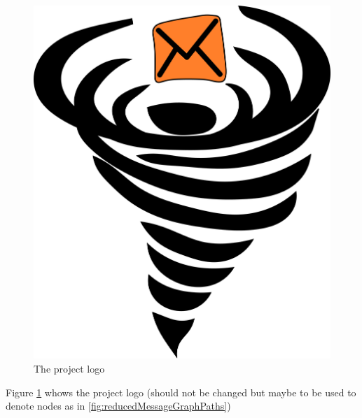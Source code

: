 \documentclass[11pt]{extarticle}
\begin{document}
	\begin{figure}[!h]
	\centering\includegraphics[width=\columnwidth]{../../../../website/src/main/jbake/assets/images/MessageVortexLogo_huge}
	\caption{The project logo}
	\label{fig:logo}
	\end{figure}
	Figure \ref{fig:logo} whows the project logo (should not be changed but maybe to be used to denote nodes as in \cref{fig:reducedMessageGraphPaths})
	
\end{document}
